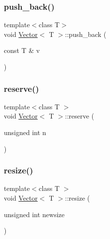 \mbox{\label{classVector_a3c2e4666a28b07791817cc9562052732_a3c2e4666a28b07791817cc9562052732}} 
\subsubsection{\texorpdfstring{push\+\_\+back()}{push\_back()}}
{\footnotesize\ttfamily template$<$class T$>$ \\
void \hyperlink{classVector}{Vector}$<$ T $>$\+::push\+\_\+back (\begin{DoxyParamCaption}\item[{const T \&}]{v }\end{DoxyParamCaption})}

\mbox{\label{classVector_af3615fa3557b68d0e65f8c5519d51a8d_af3615fa3557b68d0e65f8c5519d51a8d}} 
\subsubsection{\texorpdfstring{reserve()}{reserve()}}
{\footnotesize\ttfamily template$<$class T $>$ \\
void \hyperlink{classVector}{Vector}$<$ T $>$\+::reserve (\begin{DoxyParamCaption}\item[{unsigned int}]{n }\end{DoxyParamCaption})}

\mbox{\label{classVector_a2a6df7ae78537f9b0fe01ab7fc7cf442_a2a6df7ae78537f9b0fe01ab7fc7cf442}} 
\subsubsection{\texorpdfstring{resize()}{resize()}\hspace{0.1cm}{\footnotesize\ttfamily [1/2]}}
{\footnotesize\ttfamily template$<$class T $>$ \\
void \hyperlink{classVector}{Vector}$<$ T $>$\+::resize (\begin{DoxyParamCaption}\item[{unsigned int}]{newsize }\end{DoxyParamCaption})}


